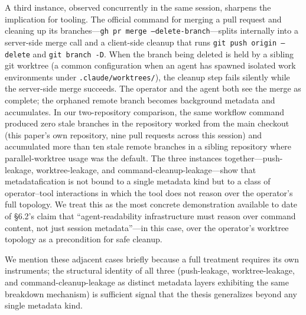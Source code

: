 \documentclass[12pt]{article}
\begin{document}
A third instance, observed concurrently in the same session, sharpens the implication for tooling. The official command for merging a pull request and cleaning up its branches---\texttt{gh pr merge --delete-branch}---splits internally into a server-side merge call and a client-side cleanup that runs \texttt{git push origin --delete} and \texttt{git branch -D}. When the branch being deleted is held by a sibling git worktree (a common configuration when an agent has spawned isolated work environments under \texttt{.claude/worktrees/}), the cleanup step fails silently while the server-side merge succeeds. The operator and the agent both see the merge as complete; the orphaned remote branch becomes background metadata and accumulates. In our two-repository comparison, the same workflow command produced zero stale branches in the repository worked from the main checkout (this paper's own repository, nine pull requests across this session) and accumulated more than ten stale remote branches in a sibling repository where parallel-worktree usage was the default. The three instances together---push-leakage, worktree-leakage, and command-cleanup-leakage---show that metadatafication is not bound to a single metadata kind but to a class of operator--tool interactions in which the tool does not reason over the operator's full topology. We treat this as the most concrete demonstration available to date of \S6.2's claim that ``agent-readability infrastructure must reason over command content, not just session metadata''---in this case, over the operator's worktree topology as a precondition for safe cleanup.

We mention these adjacent cases briefly because a full treatment requires its own instruments; the structural identity of all three (push-leakage, worktree-leakage, and command-cleanup-leakage as distinct metadata layers exhibiting the same breakdown mechanism) is sufficient signal that the thesis generalizes beyond any single metadata kind.
\end{document}
